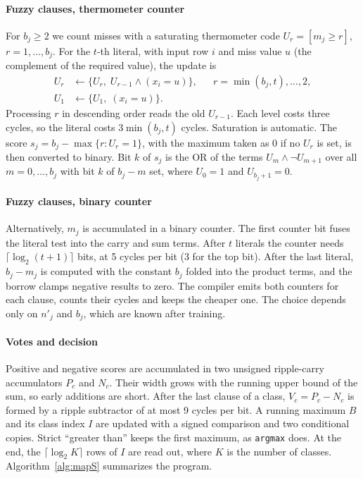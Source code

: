 \paragraph{Fuzzy clauses, thermometer counter}
For $b_j\ge2$ we count misses with a saturating thermometer code $U_r=[m_j\ge r]$, $r=1,\dots,b_j$.
For the $t$-th literal, with input row $i$ and miss value $u$ (the complement of the required value), the update is
\begin{align}
U_r &\leftarrow \{U_r,\; U_{r-1}\wedge(x_i{=}u)\}, && r=\min(b_j,t),\dots,2,\\
U_1 &\leftarrow \{U_1,\; (x_i{=}u)\}.
\end{align}
Processing $r$ in descending order reads the old $U_{r-1}$.
Each level costs three cycles, so the literal costs $3\min(b_j,t)$ cycles.
Saturation is automatic. The score $s_j=b_j-\max\{r:U_r=1\}$, with the maximum taken as 0 if no $U_r$ is set, is then converted to binary. Bit $k$ of $s_j$ is the OR of the terms $U_m\wedge\lnot U_{m+1}$ over all $m=0,\dots,b_j$ with bit $k$ of $b_j-m$ set, where $U_0=1$ and $U_{b_j+1}=0$.

\paragraph{Fuzzy clauses, binary counter}
Alternatively, $m_j$ is accumulated in a binary counter.
The first counter bit fuses the literal test into the carry and sum terms.
After $t$ literals the counter needs $\lceil\log_2(t+1)\rceil$ bits, at 5 cycles per bit (3 for the top bit).
After the last literal, $b_j-m_j$ is computed with the constant $b_j$ folded into the product terms, and the borrow clamps negative results to zero.
The compiler emits both counters for each clause, counts their cycles and keeps the cheaper one.
The choice depends only on $n'_j$ and $b_j$, which are known after training.

\paragraph{Votes and decision}
Positive and negative scores are accumulated in two unsigned ripple-carry accumulators $P_c$ and $N_c$.
Their width grows with the running upper bound of the sum, so early additions are short.
After the last clause of a class, $V_c=P_c-N_c$ is formed by a ripple subtractor of at most 9 cycles per bit.
A running maximum $B$ and its class index $I$ are updated with a signed comparison and two conditional copies.
Strict ``greater than'' keeps the first maximum, as \texttt{argmax} does.
At the end, the $\lceil\log_2 K\rceil$ rows of $I$ are read out, where $K$ is the number of classes.
Algorithm~\ref{alg:mapS} summarizes the program.


